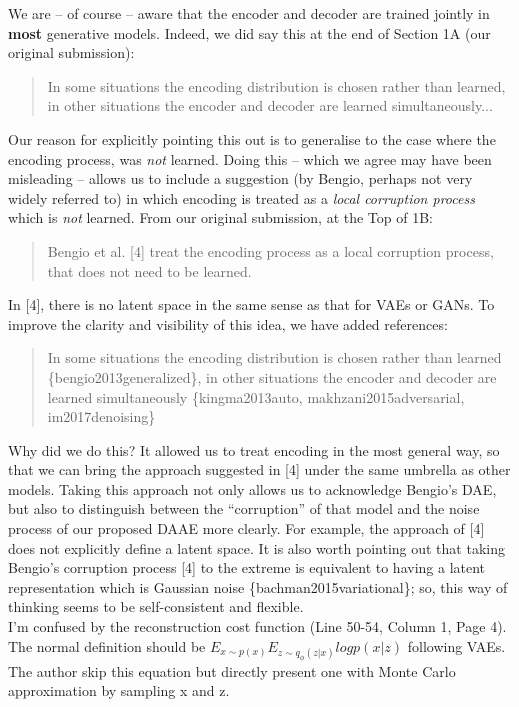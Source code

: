 \documentclass{article}
\begin{document}
 We are -- of course -- aware that the encoder and decoder are trained jointly in \textbf{most} generative models. Indeed, we did say this at the end of Section 1A (our original submission):
    \begin{quote}
        In some situations the encoding distribution is chosen rather than learned, in other  situations the encoder and decoder are learned simultaneously...
    \end{quote}
Our reason for explicitly pointing this out is to generalise to the case where the encoding process, was {\em not} learned. Doing this -- which we agree may have been misleading -- allows us to include a suggestion (by Bengio, perhaps not very widely referred to) in which encoding is treated as a {\em local corruption process} which is {\em not} learned.  From our original submission, at the Top of 1B:
    \begin{quote}
        Bengio  et  al.  [4]  treat  the  encoding  process  as  a  local corruption  process,  that  does  not  need  to  be  learned.
    \end{quote}
In [4], there is no latent space in the same sense as that for VAEs or GANs. To improve the clarity and visibility of this idea, we have added references:
\begin{quote}
    In some situations the encoding distribution is chosen rather than learned \{bengio2013generalized\}, in other situations the encoder and decoder are learned simultaneously \{kingma2013auto, makhzani2015adversarial, im2017denoising\}
\end{quote}
Why did we do this?  It allowed us to treat encoding in the most general way, so that we can bring the approach suggested in [4] under the same umbrella as other models. Taking this approach not only allows us to acknowledge Bengio's DAE, but also to distinguish between the ``corruption'' of that model and the noise process of our proposed DAAE more clearly. For example, the approach of [4] does not explicitly define a latent space.  It is also worth pointing out that taking Bengio's corruption process [4] to the extreme is equivalent to having a latent representation which is Gaussian noise \{bachman2015variational\}; so, this way of thinking seems to be self-consistent and flexible.\\


{\color{blue}
I’m confused by the reconstruction cost function (Line 50-54, Column 1, Page 4). The normal definition should be $E_{x\sim p(x)} E_{z\sim q_{\phi}(z|x)} log p(x | z)$ following VAEs. The author skip this equation but directly present one with Monte Carlo approximation by sampling x and z. }\\
\end{document}
